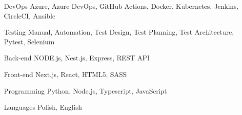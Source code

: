 

\begin{cvskills}

  \cvskill
    {DevOps} %
    {Azure, Azure DevOps, GitHub Actions, Docker, Kubernetes, Jenkins, CircleCI, Ansible} %

  \cvskill
    {Testing} %
    {Manual, Automation, Test Design, Test Planning, Test Architecture, Pytest, Selenium} %

  \cvskill
    {Back-end} %
    {NODE.js, Nest.js, Express, REST API} %

  \cvskill
    {Front-end} %
    {Next.js, React, HTML5, SASS} %

  \cvskill
    {Programming} %
    {Python, Node.js, Typescript, JavaScript} %

  \cvskill
    {Languages} %
    {Polish, English} %

\end{cvskills}
